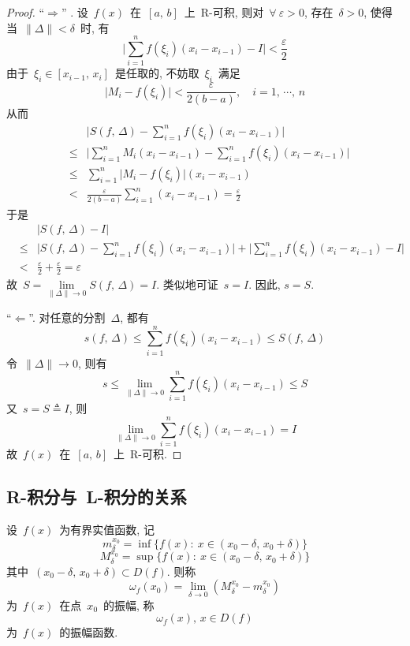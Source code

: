 \begin{proof}
``$\Rightarrow$'' . 设~$f(x)$~在~$[a,\,  b]$~上~R-可积, 则对~$\forall~\varepsilon > 0$, 存在~$\delta > 0$,
使得当~$\|\Delta\| < \delta$~时, 有
\[
\Big| \sum_{i=1}^n f(\xi_i) (x_i - x_{i-1}) - I \Big| < \frac{\varepsilon}{2}
\]
由于~$\xi_i \in [x_{i-1},\,  x_i]$~是任取的, 不妨取~$\xi_i$~满足
\[
\big| M_i - f(\xi_i) \big| < \frac{\varepsilon}{2(b-a)},  \quad i = 1,\, \cdots,\,  n
\]
从而
\begin{eqnarray*}
&& \Big| S(f,\, \Delta) - \sum_{i=1}^n f(\xi_i) (x_i - x_{i-1}) \Big| \\
&\leqslant& \Big| \sum_{i=1}^n M_i (x_i - x_{i-1}) - \sum_{i=1}^n f(\xi_i) (x_i - x_{i-1}) \Big| \\
&\leqslant& \sum_{i=1}^n \big| M_i - f(\xi_i) \big| (x_i - x_{i-1}) \\
&<& \frac{\varepsilon}{2(b-a)} \sum_{i=1}^n (x_i - x_{i-1}) = \frac{\varepsilon}{2}
\end{eqnarray*}
于是
\begin{eqnarray*}
&&\big| S(f,\, \Delta) - I \big| \\
&\leqslant& \Big| S(f,\, \Delta) - \sum_{i=1}^n f(\xi_i) (x_i - x_{i-1}) \Big| + \Big| \sum_{i=1}^n f(\xi_i) (x_i - x_{i-1}) - I \Big| \\
&<& \frac{\varepsilon}{2} + \frac{\varepsilon}{2} = \varepsilon
\end{eqnarray*}
故~$S = \lim\limits_{\|\Delta\| \to 0} S(f,\, \Delta) = I$. 类似地可证~$s = I$. 因此, $s = S$.

``$\Leftarrow$''. 对任意的分割~$\Delta$, 都有
\[
s(f,\, \Delta) \leqslant \sum_{i=1}^n f(\xi_i) (x_i - x_{i-1}) \leqslant S(f,\, \Delta)
\]
令~$\|\Delta\| \to 0$, 则有
\[
s \leqslant \lim_{\|\Delta\| \to 0} \sum_{i=1}^n f(\xi_i) (x_i - x_{i-1}) \leqslant S
\]
又~$s = S \triangleq I$, 则
\[
\lim\limits_{\|\Delta\| \to 0} \sum\limits_{i=1}^n f(\xi_i) (x_i - x_{i-1}) = I
\]
故~$f(x)$~在~$[a,\, b]$~上~R-可积.
\end{proof}

\subsection{R-积分与~L-积分的关系}

\begin{definition}
设~$f(x)$~为有界实值函数, 记
\[
m^{x_0}_\delta = \inf\{f(x): \: x \in (x_0 - \delta,\,  x_0 + \delta)\}
\]
\[
M^{x_0}_\delta = \sup\{f(x): \: x \in (x_0 - \delta,\,  x_0 + \delta)\}
\]
其中~$(x_0 - \delta, \, x_0 + \delta) \subset D(f)$. 则称
\[
\omega_f(x_0) = \lim\limits_{\delta \to 0} (M^{x_0}_\delta - m^{x_0}_\delta)
\]
为~$f(x)$~在点~$x_0$~的振幅, 称
\[
\omega_f(x),\, x \in D(f)
\]
为~$f(x)$~的振幅函数.
\end{definition}

